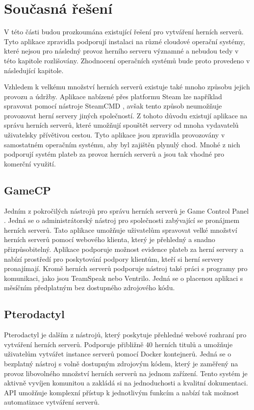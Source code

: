 \chapter[Současná řešení]{Současná řešení}

V této části budou prozkoumána existující řešení pro vytváření herních serverů. Tyto aplikace zpravidla podporují instalaci na různé cloudové operační systémy,
které nejsou pro následný provoz herního serveru významné a nebudou tedy v této kapitole rozlišovány. Zhodnocení operačních systémů bude proto provedeno v následující kapitole.

Vzhledem k velkému množství herních serverů existuje také mnoho způsobu jejich provozu a údržby. Aplikace nabízené přes platformu Steam
lze například spravovat pomocí nástroje SteamCMD \cite{steamcmd}, avšak tento způsob neumožňuje provozovat herní servery jiných společností.
Z tohoto důvodu existují aplikace na správu herních serverů, které umožňují spouštět servery od mnoha vydavatelů uživatelsky přívětivou cestou.
Tyto aplikace jsou zpravidla provozovány v samostatném operačním systému, aby byl zajištěn plynulý chod.
Mnohé z nich podporují systém plateb za provoz herních serverů a jsou tak vhodné pro komerční využití.

\section{GameCP}

Jedním z pokročilých nástrojů pro správu herních serverů je Game Control Panel \cite{gamecp}. Jedná se o administrátorský nástroj pro společnosti
zabývající se pronájmem herních serverů. Tato aplikace umožňuje uživatelům spravovat velké množství herních serverů pomocí webového klienta,
který je přehledný a snadno přizpůsobitelný. Aplikace podporuje možnost evidence plateb za herní servery a nabízí prostředí pro poskytování
podpory klientům, kteří si herní servery pronajímají. Kromě herních serverů podporuje nástroj také práci s programy pro komunikaci, jako jsou TeamSpeak
nebo Ventrilo. Jedná se o placenou aplikaci s měsíčním předplatným bez dostupného zdrojového kódu.

\section{Pterodactyl}

Pterodactyl \cite{pterodactyl} je dalším z nástrojů, který poskytuje přehledné webové rozhraní pro vytváření herních serverů.
Podporuje přibližně 40 herních titulů a umožňuje uživatelům vytvářet instance serverů pomocí Docker kontejnerů. Jedná se o bezplatný nástroj
s volně dostupným zdrojovým kódem, který je zaměřený na provoz libovolného množství herních serverů na jednom zařízení. Tento systém je aktivně vyvíjen komunitou
a zakládá si na jednoduchosti a kvalitní dokumentaci. API umožňuje komplexní přístup k jednotlivým funkcím a nabízí tak možnost automatizace
vytváření serverů.

